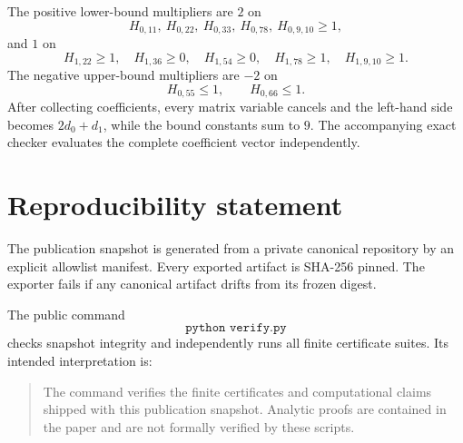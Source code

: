 \documentclass[11pt]{article}
\theoremstyle{definition}
\begin{document}
The positive lower-bound multipliers are $2$ on
\[
H_{0,11},\ H_{0,22},\ H_{0,33},\ H_{0,78},\ H_{0,9,10}\ge1,
\]
and $1$ on
\[
H_{1,22}\ge1,\quad
H_{1,36}\ge0,\quad
H_{1,54}\ge0,\quad
H_{1,78}\ge1,\quad
H_{1,9,10}\ge1.
\]
The negative upper-bound multipliers are $-2$ on
\[
H_{0,55}\le1,
\qquad
H_{0,66}\le1.
\]
After collecting coefficients, every matrix variable cancels and the left-hand side becomes
$2d_0+d_1$, while the bound constants sum to $9$.
The accompanying exact checker evaluates the complete coefficient vector independently.

\section{Reproducibility statement}

The publication snapshot is generated from a private canonical repository by an explicit
allowlist manifest.  Every exported artifact is SHA-256 pinned.  The exporter fails if any
canonical artifact drifts from its frozen digest.

The public command
\[
\texttt{python verify.py}
\]
checks snapshot integrity and independently runs all finite certificate suites.
Its intended interpretation is:

\begin{quote}
The command verifies the finite certificates and computational claims shipped with this
publication snapshot.  Analytic proofs are contained in the paper and are not formally verified
by these scripts.
\end{quote}



\end{document}
